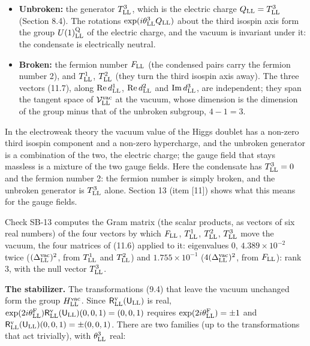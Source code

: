 \documentclass[
  10pt,
]{article}
\providecommand{\tightlist}{%
  \setlength{\itemsep}{0pt}\setlength{\parskip}{0pt}}
\begin{document}
\begin{itemize}
\tightlist
\item
  \textbf{Unbroken:} the generator \(T^3_{\rm LL}\), which is the
  electric charge \(Q_{\rm LL}=T^3_{\rm LL}\) (Section 8.4). The
  rotations \(\exp(i\theta^3_{\rm LL}Q_{\rm LL})\) about the third
  isospin axis form the group \(U(1)^{\rm Q}_{\rm LL}\) of the electric
  charge, and the vacuum is invariant under it: the condensate is
  electrically neutral.
\item
  \textbf{Broken:} the fermion number \(F_{\rm LL}\) (the condensed
  pairs carry the fermion number 2), and \(T^1_{\rm LL}\),
  \(T^2_{\rm LL}\) (they turn the third isospin axis away). The three
  vectors (11.7), along \({\rm Re}\,d^1_{\rm LL}\),
  \({\rm Re}\,d^2_{\rm LL}\) and \({\rm Im}\,d^3_{\rm LL}\), are
  independent; they span the tangent space of
  \(\mathcal V^{\rm vac}_{\rm LL}\) at the vacuum, whose dimension is
  the dimension of the group minus that of the unbroken subgroup,
  \(4-1=3\).
\end{itemize}

In the electroweak theory the vacuum value of the Higgs doublet has a
non-zero third isospin component and a non-zero hypercharge, and the
unbroken generator is a combination of the two, the electric charge; the
gauge field that stays massless is a mixture of the two gauge fields.
Here the condensate has \(T^3_{\rm LL}=0\) and the fermion number 2: the
fermion number is simply broken, and the unbroken generator is
\(T^3_{\rm LL}\) alone. Section 13 (item {[}11{]}) shows what this means
for the gauge fields.

Check SB-13 computes the Gram matrix (the scalar products, as vectors of
six real numbers) of the four vectors by which \(F_{\rm LL}\),
\(T^1_{\rm LL}\), \(T^2_{\rm LL}\), \(T^3_{\rm LL}\) move the vacuum,
the four matrices of (11.6) applied to it: eigenvalues \(0\),
\(4.389\times10^{-2}\) twice (\((\Delta^{\rm vac}_{\rm LL})^2\), from
\(T^1_{\rm LL}\) and \(T^2_{\rm LL}\)) and \(1.755\times10^{-1}\)
(\(4(\Delta^{\rm vac}_{\rm LL})^2\), from \(F_{\rm LL}\)): rank 3, with
the null vector \(T^3_{\rm LL}\).

\textbf{The stabilizer.} The transformations (9.4) that leave the vacuum
unchanged form the group \(H^{\rm vac}_{\rm LL}\). Since
\(\mathsf R^{\rm v}_{\rm LL}(\mathsf U_{\rm LL})\) is real,
\(\exp(2i\theta^{\rm F}_{\rm LL})\mathsf R^{\rm v}_{\rm LL}(\mathsf U_{\rm LL})(0,0,1)=(0,0,1)\)
requires \(\exp(2i\theta^{\rm F}_{\rm LL})=\pm1\) and
\(\mathsf R^{\rm v}_{\rm LL}(\mathsf U_{\rm LL})(0,0,1)=\pm(0,0,1)\).
There are two families (up to the transformations that act trivially),
with \(\theta^3_{\rm LL}\) real:
\end{document}

